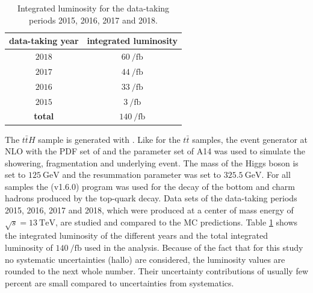 %
\begin{table}[htbp]
		\centering
                \renewcommand{\arraystretch}{1.2}       
		\begin{tabular*}{\linewidth}{@{\extracolsep{\fill}}cc}
		\hline
		\hline
		\textbf{data-taking year}&  \textbf{integrated luminosity}
		\\
		\hline
                $2018$                & $\SI{60}{\per\femto\barn}$
                \\
                $2017$                & $\SI{44}{\per\femto\barn}$
                \\
                $2016$                & $\SI{33}{\per\femto\barn}$
                \\
                $2015$                & $\SI{3}{\per\femto\barn}$
                \\
                \hline
                \textbf{total}        & $\SI{140}{\per\femto\barn}$
                \\
		\hline
		\hline
		\end{tabular*}
		\caption[Integrated luminosity for the data-taking periods 2015-2018.]{Integrated luminosity for the data-taking periods 2015, 2016, 2017 and 2018.}
\label{datalumi}
\renewcommand{\arraystretch}{1}
\end{table}
%
The $t\bar{t}H$ sample is generated with {\POWHEG}. Like for the $t\bar{t}$ samples, the event generator {\Pythia} at NLO with the PDF set of {\NNPDFz} and the parameter set of A14 was used to simulate the showering, fragmentation and underlying event. The mass of the Higgs boson is set to $\SI{125}{\giga\electronvolt}$ and the resummation parameter was set to $\SI{325.5}{\giga\electronvolt}$. \newline
For all samples the {\EvtGen} (v1.6.0) \cite{EvtGen} program was used for the decay of the bottom and charm hadrons produced by the top-quark decay.\newline
Data sets of the data-taking periods 2015, 2016, 2017 and 2018, which were produced at a center of mass energy of $\sqrt{s}=\SI{13}{\tera\electronvolt}$, are studied and compared to the MC predictions. Table \ref{datalumi} shows the integrated luminosity of the different years and the total integrated luminosity of $\SI{140}{\per\femto\barn}$ used in the analysis. Because of the fact that for this study no systematic uncertainties (hallo) are considered, the luminosity values are rounded to the next whole number. Their uncertainty contributions of usually few percent are small compared to uncertainties from systematics.
